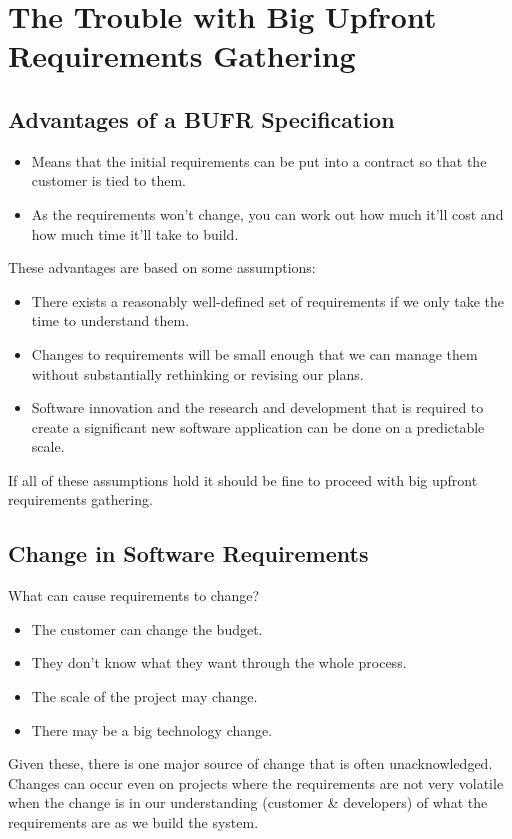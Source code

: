 \documentclass{article}
\begin{document}
\section{The Trouble with Big Upfront Requirements Gathering}
\subsection{Advantages of a BUFR Specification}
\begin{itemize}
	\item Means that the initial requirements can be put into a contract so that the customer is tied to them.
	\item As the requirements won't change, you can work out how much it'll cost and how much time it'll take to build.
\end{itemize}
These advantages are based on some assumptions:
\begin{itemize}
	\item There exists a reasonably well-defined set of requirements if we only take the time to understand them.
	\item Changes to requirements will be small enough that we can manage them without substantially rethinking or revising our plans.
	\item Software innovation and the research and development that is required to create a significant new software application can be done on a predictable scale.
\end{itemize}
If all of these assumptions hold it should be fine to proceed with big upfront requirements gathering.
\subsection{Change in Software Requirements}
What can cause requirements to change?
\begin{itemize}
	\item The customer can change the budget.
	\item They don't know what they want through the whole process.
	\item The scale of the project may change.
	\item There may be a big technology change.
\end{itemize}
Given these, there is one major source of change that is often unacknowledged. Changes can occur even on projects where the requirements are not very volatile when the change is in our understanding (customer \& developers) of what the requirements are as we build the system.
\end{document}

